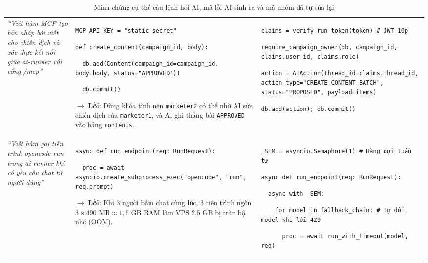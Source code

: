 \begin{table}[!htbp]
\centering
\scriptsize
\renewcommand{\arraystretch}{1.03}
\caption{Minh chứng cụ thể câu lệnh hỏi AI, mã lỗi AI sinh ra và mã nhóm đã tự sửa lại}
\label{tab:sdlc-code-diff}
\begin{tabularx}{\textwidth}{|L{3.2cm}|Y|Y|}
\hline
{} &  & \\
\hline
\textit{``Viết hàm MCP tạo bản nháp bài viết cho chiến dịch và xác thực kết nối giữa ai-runner với cổng /mcp''} &
\texttt{MCP\_API\_KEY = "static-secret"}\par
\texttt{def create\_content(campaign\_id, body):}\par
\texttt{~~db.add(Content(campaign\_id=campaign\_id, body=body, status="APPROVED"))}\par
\texttt{~~db.commit()}\par
$\rightarrow$ \textbf{Lỗi}: Dùng khóa tĩnh nên \texttt{marketer2} có thể nhờ AI sửa chiến dịch của \texttt{marketer1}, và AI ghi thẳng bài \texttt{APPROVED} vào bảng \texttt{contents}. &
\texttt{claims = verify\_run\_token(token) \# JWT 10p}\par
\texttt{require\_campaign\_owner(db, campaign\_id, claims.user\_id, claims.role)}\par
\texttt{action = AIAction(thread\_id=claims.thread\_id, action\_type="CREATE\_CONTENT\_BATCH", status="PROPOSED", payload=items)}\par
\texttt{db.add(action); db.commit()}\\
\hline
\textit{``Viết hàm gọi tiến trình opencode run trong ai-runner khi có yêu cầu chat từ người dùng''} &
\texttt{async def run\_endpoint(req: RunRequest):}\par
\texttt{~~proc = await asyncio.create\_subprocess\_exec("opencode", "run", req.prompt)}\par
$\rightarrow$ \textbf{Lỗi}: Khi 3 người bấm chat cùng lúc, 3 tiến trình ngốn $3 \times 490\text{ MB} \approx 1,5\text{ GB RAM}$ làm VPS 2,5 GB bị tràn bộ nhớ (OOM). &
\texttt{\_SEM = asyncio.Semaphore(1) \# Hàng đợi tuần tự}\par
\texttt{async def run\_endpoint(req: RunRequest):}\par
\texttt{~~async with \_SEM:}\par
\texttt{~~~~for model in fallback\_chain: \# Tự đổi model khi lỗi 429}\par
\texttt{~~~~~~proc = await run\_with\_timeout(model, req)}\\
\hline
\end{tabularx}
\end{table}
